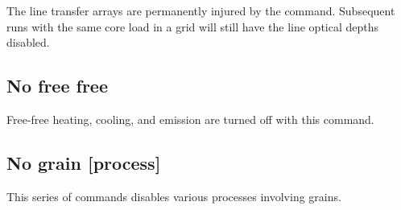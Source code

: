 The line transfer arrays are permanently injured by the
 command.
Subsequent runs with the same core load in a grid will still have
the line optical depths disabled.

\subsection{No free free}

Free-free heating, cooling, and emission are turned off with this command.

\subsection{No grain [process]}

This series of commands disables various processes involving grains.
